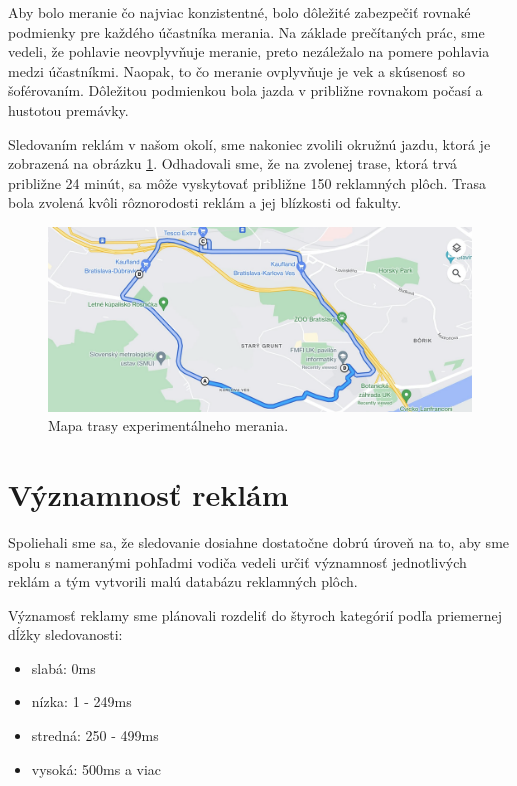 
Aby bolo meranie čo najviac konzistentné, bolo dôležité zabezpečiť rovnaké podmienky pre každého účastníka merania. Na základe prečítaných prác, %
sme vedeli, že pohlavie neovplyvňuje meranie, preto nezáležalo na pomere pohlavia medzi účastníkmi. Naopak, to čo meranie ovplyvňuje je vek a skúsenosť so šoférovaním. Dôležitou podmienkou bola jazda v približne rovnakom počasí a hustotou premávky.

Sledovaním reklám v našom okolí, sme nakoniec zvolili okružnú jazdu, ktorá je zobrazená na obrázku \ref{img:road}. Odhadovali sme, že na zvolenej trase, ktorá trvá približne 24 minút, sa môže vyskytovať približne 150 reklamných plôch. Trasa bola zvolená kvôli rôznorodosti reklám a jej blízkosti od fakulty.

\begin{figure}[ht]
    \centering
    \includegraphics[width=1\textwidth]{images/03/map.png}
    \caption{Mapa trasy experimentálneho merania.}
    \label{img:road}
\end{figure}

\section{Významnosť reklám}

Spoliehali sme sa, že sledovanie dosiahne dostatočne dobrú úroveň na to, aby sme spolu s nameranými pohľadmi vodiča vedeli určiť významnosť jednotlivých reklám a tým vytvorili malú databázu reklamných plôch.

Významosť reklamy sme plánovali rozdeliť do štyroch kategórií podľa priemernej dĺžky sledovanosti:

\begin{itemize}
  \item slabá: 0ms
  \item nízka: 1 - 249ms
  \item stredná: 250 - 499ms
  \item vysoká: 500ms a viac
\end{itemize}

